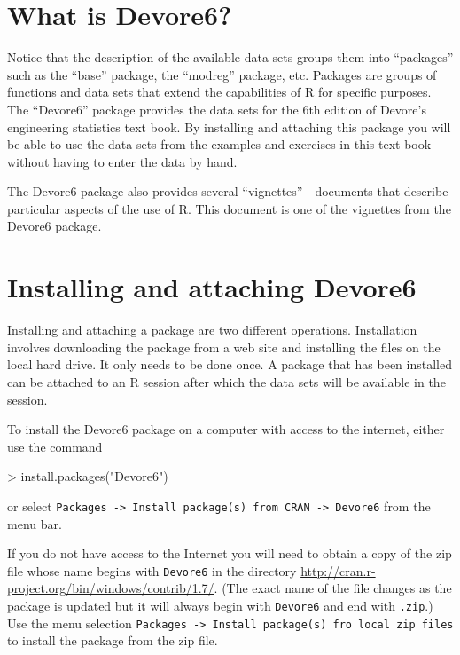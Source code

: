 \documentclass{book}
\begin{document}
\section{What is Devore6?}
\label{sec:WhatsDevore6}

Notice that the description of the available data sets groups them
into ``packages'' such as the ``base'' package, the ``modreg''
package, etc.  Packages are groups of functions and data sets that
extend the capabilities of R for specific purposes.  The ``Devore6''
package provides the data sets for the 6th edition of Devore's
engineering statistics text book.  By installing and attaching this
package you will be able to use the data sets from the examples and
exercises in this text book without having to enter the data by hand.

The Devore6 package also provides several ``vignettes'' - documents
that describe particular aspects of the use of R.   This document is
one of the vignettes from the Devore6 package.


\section{Installing and attaching Devore6}
\label{sec:Installing}

Installing and attaching a package are two different operations.
Installation involves downloading the package from a web site and
installing the files on the local hard drive.  It only needs to be
done once.  A package that has been installed can be attached to an R
session after which the data sets will be available in the session.

To install the Devore6 package on a computer with access to the
internet, either use the command
\begin{Schunk}
\begin{Sinput}
> install.packages("Devore6")
\end{Sinput}
\end{Schunk}
or select \texttt{Packages -> Install package(s) from CRAN -> Devore6}
from the menu bar.

If you do not have access to the Internet you will need to obtain a
copy of the zip file whose name begins with \texttt{Devore6} in the
directory \url{http://cran.r-project.org/bin/windows/contrib/1.7/}.
(The exact name of the file changes as the package is updated but it
will always begin with \texttt{Devore6} and end with \texttt{.zip}.)
Use the menu selection \texttt{Packages -> Install package(s) fro
local zip files} to install the package from the zip file.
\end{document}
